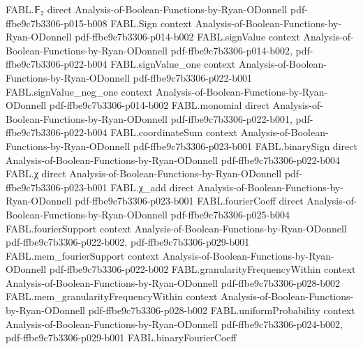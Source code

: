 \begin{theorem}
\label{FABL.binaryFourierCoeff_convolution}
\leanok
{}
\proofstep
  {FABL.𝔽₂}
  {direct}
  {Analysis-of-Boolean-Functions-by-Ryan-ODonnell}
  {pdf-ffbe9c7b3306-p015-b008}
\proofstep
  {FABL.Sign}
  {context}
  {Analysis-of-Boolean-Functions-by-Ryan-ODonnell}
  {pdf-ffbe9c7b3306-p014-b002}
\proofstep
  {FABL.signValue}
  {context}
  {Analysis-of-Boolean-Functions-by-Ryan-ODonnell}
  {pdf-ffbe9c7b3306-p014-b002,
    pdf-ffbe9c7b3306-p022-b004}
\proofstep
  {FABL.signValue_one}
  {context}
  {Analysis-of-Boolean-Functions-by-Ryan-ODonnell}
  {pdf-ffbe9c7b3306-p022-b001}
\proofstep
  {FABL.signValue_neg_one}
  {context}
  {Analysis-of-Boolean-Functions-by-Ryan-ODonnell}
  {pdf-ffbe9c7b3306-p014-b002}
\proofstep
  {FABL.monomial}
  {direct}
  {Analysis-of-Boolean-Functions-by-Ryan-ODonnell}
  {pdf-ffbe9c7b3306-p022-b001,
    pdf-ffbe9c7b3306-p022-b004}
\proofstep
  {FABL.coordinateSum}
  {context}
  {Analysis-of-Boolean-Functions-by-Ryan-ODonnell}
  {pdf-ffbe9c7b3306-p023-b001}
\proofstep
  {FABL.binarySign}
  {direct}
  {Analysis-of-Boolean-Functions-by-Ryan-ODonnell}
  {pdf-ffbe9c7b3306-p022-b004}
\proofstep
  {FABL.χ}
  {direct}
  {Analysis-of-Boolean-Functions-by-Ryan-ODonnell}
  {pdf-ffbe9c7b3306-p023-b001}
\proofstep
  {FABL.χ_add}
  {direct}
  {Analysis-of-Boolean-Functions-by-Ryan-ODonnell}
  {pdf-ffbe9c7b3306-p023-b001}
\proofstep
  {FABL.fourierCoeff}
  {direct}
  {Analysis-of-Boolean-Functions-by-Ryan-ODonnell}
  {pdf-ffbe9c7b3306-p025-b004}
\proofstep
  {FABL.fourierSupport}
  {context}
  {Analysis-of-Boolean-Functions-by-Ryan-ODonnell}
  {pdf-ffbe9c7b3306-p022-b002,
    pdf-ffbe9c7b3306-p029-b001}
\proofstep
  {FABL.mem_fourierSupport}
  {context}
  {Analysis-of-Boolean-Functions-by-Ryan-ODonnell}
  {pdf-ffbe9c7b3306-p022-b002}
\proofstep
  {FABL.granularityFrequencyWithin}
  {context}
  {Analysis-of-Boolean-Functions-by-Ryan-ODonnell}
  {pdf-ffbe9c7b3306-p028-b002}
\proofstep
  {FABL.mem_granularityFrequencyWithin}
  {context}
  {Analysis-of-Boolean-Functions-by-Ryan-ODonnell}
  {pdf-ffbe9c7b3306-p028-b002}
\proofstep
  {FABL.uniformProbability}
  {context}
  {Analysis-of-Boolean-Functions-by-Ryan-ODonnell}
  {pdf-ffbe9c7b3306-p024-b002,
    pdf-ffbe9c7b3306-p029-b001}
\proofstep
  {FABL.binaryFourierCoeff}

\end{theorem}

